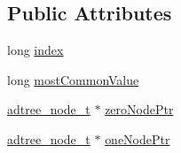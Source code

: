 \subsection*{Public Attributes}
\begin{DoxyCompactItemize}
\item 
long \hyperlink{structadtree__vary_a0753c7505ea36c82554c228716a3693b}{index}
\item 
long \hyperlink{structadtree__vary_ab2ce04a8ef80b347e2a6cc50bd36f434}{most\-Common\-Value}
\item 
\hyperlink{adtree_8h_a320946afe6df18cfa6bed04e16c49662}{adtree\-\_\-node\-\_\-t} $\ast$ \hyperlink{structadtree__vary_a7815e9cec9ae369bc8812675d055d101}{zero\-Node\-Ptr}
\item 
\hyperlink{adtree_8h_a320946afe6df18cfa6bed04e16c49662}{adtree\-\_\-node\-\_\-t} $\ast$ \hyperlink{structadtree__vary_a5716bdbe6777ae45bd8e9600a9f6b3d0}{one\-Node\-Ptr}
\end{DoxyCompactItemize}


